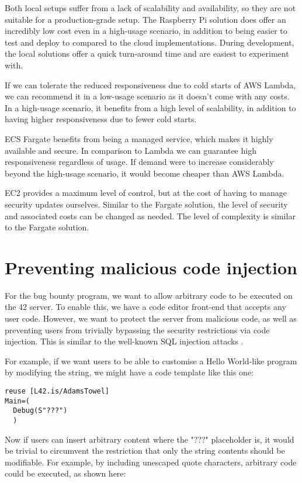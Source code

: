 Both local setups suffer from a lack of scalability and availability, so they are not suitable for a production-grade setup. The Raspberry Pi solution does offer an incredibly low cost even in a high-usage scenario, in addition to being easier to test and deploy to compared to the cloud implementations. During development, the local solutions offer a quick turn-around time and are easiest to experiment with.

If we can tolerate the reduced responsiveness due to cold starts of AWS Lambda, we can recommend it in a low-usage scenario as it doesn't come with any costs. In a high-usage scenario, it benefits from a high level of scalability, in addition to having higher responsiveness due to fewer cold starts.

ECS Fargate benefits from being a managed service, which makes it highly available and secure. In comparison to Lambda we can guarantee high responsiveness regardless of usage. If demand were to increase considerably beyond the high-usage scenario, it would become cheaper than AWS Lambda.

EC2 provides a maximum level of control, but at the cost of having to manage security updates ourselves. Similar to the Fargate solution, the level of security and associated costs can be changed as needed. The level of complexity is similar to the Fargate solution.

\section{Preventing malicious code injection}

For the bug bounty program, we want to allow arbitrary code to be executed on the 42 server. To enable this, we have a code editor front-end that accepts any user code. However, we want to protect the server from malicious code, as well as preventing users from trivially bypassing the security restrictions via code injection. This is similar to the well-known SQL injection attacks \cite{halfond2006classification}.

For example, if we want users to be able to customise a Hello World-like program by modifying the string, we might have a code template like this one:

\begin{lstlisting}[caption=Hello World-like program template]
reuse [L42.is/AdamsTowel]
Main=(
  Debug(S"???")
  )
\end{lstlisting}

Now if users can insert arbitrary content where the "???" placeholder is, it would be trivial to circumvent the restriction that only the string contents should be modifiable. For example, by including unescaped quote characters, arbitrary code could be executed, as shown here:

